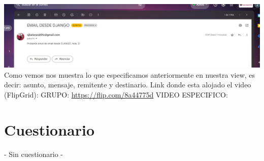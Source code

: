 \documentclass{article}
\begin{document}
        \includegraphics[width=16cm]{img/email recibido.png}
        \newline Como vemos nos muestra lo que especificamos anteriormente en nuestra view, es decir: asunto, mensaje, remitente y destinario.
        \newline
        \newline\newline 
        Link donde esta alojado el video (FlipGrid):\newline
        GRUPO:
        \url{https://flip.com/8a44775d}\newline
        VIDEO ESPECIFICO:
        \url{}
        
\section{Cuestionario}
	- Sin cuestionario -	
 \newpage
\end{document}
